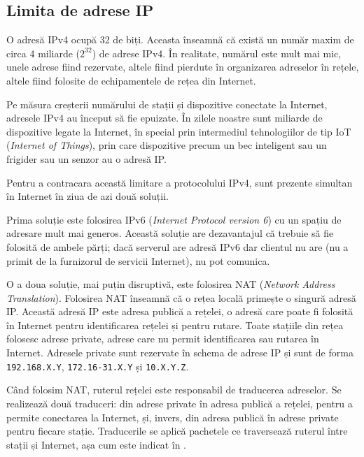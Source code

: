 \subsection{Limita de adrese IP}
\label{sec:net:tcp-ip:ip-limit}

O adresă IPv4 ocupă 32 de biți.
Aceasta înseamnă că există un număr maxim de circa 4 miliarde ($2^{32}$) de adrese IPv4.
În realitate, numărul este mult mai mic, unele adrese fiind rezervate, altele fiind pierdute în organizarea adreselor în rețele, altele fiind folosite de echipamentele de rețea din Internet.

Pe măsura creșterii numărului de stații și dispozitive conectate la Internet, adresele IPv4 au început să fie epuizate.
În zilele noastre sunt miliarde de dispozitive legate la Internet, în special prin intermediul tehnologiilor de tip IoT (\textit{Internet of Things}), prin care dispozitive precum un bec inteligent sau un frigider sau un senzor au o adresă IP.

Pentru a contracara această limitare a protocolului IPv4, sunt prezente simultan în Internet în ziua de azi două soluții.

Prima soluție este folosirea IPv6 (\textit{Internet Protocol version 6}) cu un spațiu de adresare mult mai generos.
Această soluție are dezavantajul că trebuie să fie folosită de ambele părți; dacă serverul are adresă IPv6 dar clientul nu are (nu a primit de la furnizorul de servicii Internet), nu pot comunica.

O a doua soluție, mai puțin disruptivă, este folosirea NAT  (\textit{Network Address Translation}).
Folosirea NAT înseamnă că o rețea locală primește o singură adresă IP.
Această adresă IP este adresa publică a rețelei, o adresă care poate fi folosită în Internet pentru identificarea rețelei și pentru rutare.
Toate stațiile din rețea folosesc adrese private, adrese care nu permit identificarea sau rutarea în Internet.
Adresele private sunt rezervate în schema de adrese IP și sunt de forma \texttt{192.168.X.Y}, \texttt{172.16-31.X.Y} și \texttt{10.X.Y.Z}.

Când folosim NAT, ruterul rețelei este responsabil de traducerea adreselor.
Se realizează două traduceri: din adrese private în adresa publică a rețelei, pentru a permite conectarea la Internet, și, invers, din adresa publică în adrese private pentru fiecare stație.
Traducerile se aplică pachetele ce traversează ruterul între stații și Internet, așa cum este indicat în .

